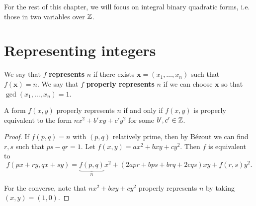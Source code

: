 For the rest of this chapter, we will focus on integral binary quadratic forms, i.e. those in two variables over $\mathbb{Z}$.
\section{Representing integers}
\begin{df}
We say that $f$ \textbf{represents} $n$ if there exists $\mathbf x=(x_1,\ldots, x_n)$ such that $f(\mathbf x)=n$. We say that $f$ \textbf{properly represents} $n$ if we can choose $\mathbf x$ so that $\gcd(x_1,\ldots, x_n)=1$.
\end{df}
\begin{lem}%
A form $f(x,y)$ properly represents $n$ if and only if $f(x,y)$ is properly equivalent to the form $nx^2+b'xy+c'y^2$ for some $b',c'\in \mathbb{Z}$.
\end{lem}
\begin{proof}
If $f(p,q)=n$ with $(p,q)$ relatively prime, then by B\'ezout we can find $r,s$ such that $ps-qr=1$. Let $f(x,y)=ax^2+bxy+cy^2$.  Then $f$ is equivalent to 
\[
f(px+ry, qx+sy) =\underbrace{f(p,q)}_{n}x^2+(2apr+bps+brq+2cqs)xy+f(r,s)y^2.
\]

For the converse, note that $nx^2+bxy+cy^2$ properly represents $n$ by taking $(x,y)=(1,0)$.
\end{proof}

